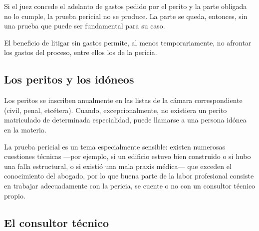 \documentclass[12pt,oneside]{book}
\begin{document}
\begin{important}
Si el juez concede el adelanto de gastos pedido por el perito y la parte obligada no lo cumple, la prueba pericial no se produce. La parte se queda, entonces, sin una prueba que puede ser fundamental para su caso.
\end{important}

\begin{note}
El beneficio de litigar sin gastos permite, al menos temporariamente, no afrontar los gastos del proceso, entre ellos los de la pericia.
\end{note}

\subsection{Los peritos y los idóneos}

Los peritos se inscriben anualmente en las listas de la cámara correspondiente (civil, penal, etcétera). Cuando, excepcionalmente, no existiera un perito matriculado de determinada especialidad, puede llamarse a una persona idónea en la materia.

\begin{important}
La prueba pericial es un tema especialmente sensible: existen numerosas cuestiones técnicas —por ejemplo, si un edificio estuvo bien construido o si hubo una falla estructural, o si existió una mala praxis médica— que exceden el conocimiento del abogado, por lo que buena parte de la labor profesional consiste en trabajar adecuadamente con la pericia, se cuente o no con un consultor técnico propio.
\end{important}

\subsection{El consultor técnico}
\end{document}
